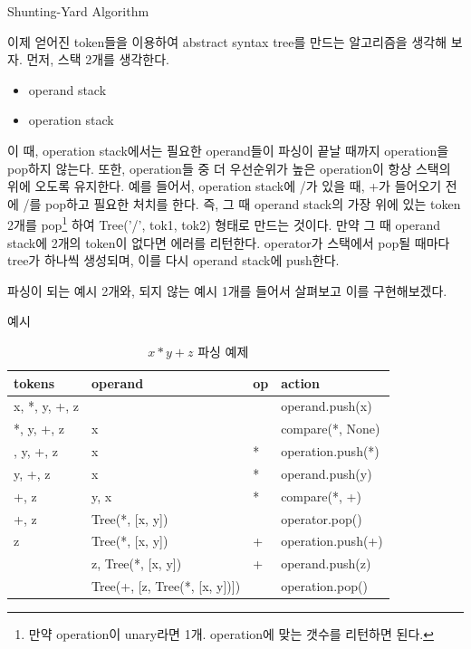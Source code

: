 \documentclass{beamer}
\begin{document}
\begin{frame}{Shunting-Yard Algorithm} 

이제 얻어진 token들을 이용하여 abstract syntax tree를 만드는 알고리즘을 생각해 보자. 먼저, 스택 2개를 생각한다. 

\begin{itemize} 
\item operand stack 
\item operation stack 
\end{itemize}

이 때, operation stack에서는 필요한 operand들이 파싱이 끝날 때까지 operation을 pop하지 않는다. 또한, operation들 중 더 우선순위가 높은 operation이 항상 스택의 위에 오도록 유지한다. 예를 들어서, operation stack에 /가 있을 때, +가 들어오기 전에 /를 pop하고 필요한 처치를 한다. 즉, 그 때 operand stack의 가장 위에 있는 token 2개를 pop\footnote{만약 operation이 unary라면 1개. operation에 맞는 갯수를 리턴하면 된다.}  하여 Tree('/', tok1, tok2) 형태로 만드는 것이다. 만약 그 때 operand stack에 2개의 token이 없다면 에러를 리턴한다. operator가 스택에서 pop될 때마다 tree가 하나씩 생성되며, 이를 다시 operand stack에 push한다.

파싱이 되는 예시 2개와, 되지 않는 예시 1개를 들어서 살펴보고 이를 구현해보겠다. 

\end{frame}

\begin{frame}{예시}
\begin{table}[]
\centering
\caption{$x*y+z$ 파싱 예제}
\label{my-label}
\begin{tabular}{|l|l|l|l|}
\hline
tokens & operand  & op  & action \\ \hline
x, *, y, +, z &     &  & operand.push(x)     \\ \hline
*, y, +, z &  x   &  & compare(*, None)     \\ \hline
, y, +, z &  x   & * & operation.push(*)    \\ \hline
y, +, z &  x   & * & operand.push(y)     \\ \hline
+, z &  y, x  & * & compare(*, +)     \\ \hline
+, z &  Tree(*, [x, y])   &  & operator.pop()     \\ \hline
z &  Tree(*, [x, y])   & + & operation.push(+)     \\ \hline
&  z, Tree(*, [x, y])   & + & operand.push(z)     \\ \hline
&  Tree(+, [z, Tree(*, [x, y])])   &  & operation.pop()     \\ \hline
\end{tabular}
\end{table}


\end{frame}
\end{document}
